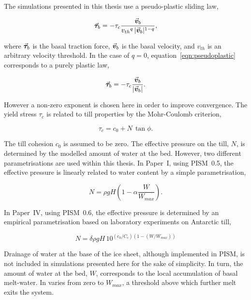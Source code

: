 \documentclass{article}
\newcommand{\vect}[1]{\va*{#1}} %
\newcommand{\vv}[0]{\vect{v}}           %
\begin{document}
The simulations presented in this thesis use a pseudo-plastic sliding law,

\begin{equation}
    \label{eqn:pseudoplastic}
    \vect{\tau}_b = -\tau_c \frac{\vv_b}{{v_{th}}^q\,|\vv_b|^{1-q}},
\end{equation}

where $\vect{\tau}_b$ is the basal traction force, $\vv_b$ is the basal
velocity, and $v_{th}$ is an arbitrary velocity threshold. In the case of
$q=0$, equation~\ref{eqn:pseudoplastic} corresponds to a purely plastic law,

\begin{equation}
    \label{eqn:plastic}
    \vect{\tau}_b = -\tau_c \frac{\vv_b}{|\vv_b|}.
\end{equation}

However a non-zero exponent is chosen here in order to improve convergence. The
yield stress $\tau_c$ is related to till properties by the Mohr-Coulomb
criterion,

\begin{equation}
   \tau_c = c_0 + N\,\tan{\phi}.
\end{equation}

The till cohesion $c_0$ is assumed to be zero. The effective pressure on the
till, $N$, is determined by the modelled amount of water at the bed. However,
two different parametrisations are used within this thesis. In Paper~I, using
PISM~0.5, the effective pressure is linearly related to water content by a
simple parametrisation,

\begin{equation}
    N = \rho gH (1 - \alpha \frac{W}{W_{max}}).
\end{equation}

In Paper~IV, using PISM~0.6, the effective pressure is determined by an
empirical parametrisation based on laboratory experiments on Antarctic till,

\begin{equation}
    N = \delta \rho gH \, 10^{(e_0/C_c) (1 - (W/W_{max}))}
\end{equation}

Drainage of water at the base of the ice sheet, although implemented in PISM,
is not included in simulations presented here for the sake of simplicity.
In turn, the amount of water at the bed, $W$, corresponds to the local
accumulation of basal melt-water. In varies from zero to $W_{max}$, a threshold
above which further melt exits the system.
\end{document}
